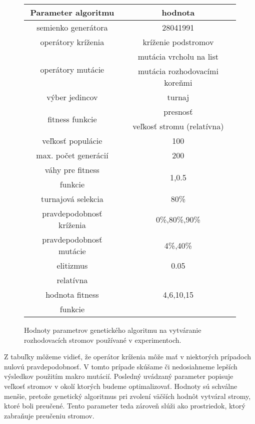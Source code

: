 \begin{figure}[h]
\centering
\begin{tabular}{|c c|}
\hline 
Parameter algoritmu & hodnota \\
\hline
semienko generátora & 28041991 \\
\hline
operátory kríženia & kríženie podstromov \\
\hline
\multirow{2}{*}{operátory mutácie} & mutácia vrcholu na list \\
 & mutácia rozhodovacími koreňmi \\
\hline
výber jedincov & turnaj \\
\hline
\multirow{2}{*}{fitness funkcie} & presnosť\\
 & veľkosť stromu (relatívna) \\
\hline
veľkosť populácie & 100 \\
\hline
max. počet generácií & 200 \\
\hline
váhy pre fitness & \multirow{2}{*}{1,0.5} \\
funkcie & \\
\hline
turnajová selekcia & 80\% \\
\hline
pravdepodobnosť kríženia & 0\%,80\%,90\%\\
\hline
pravdepodobnosť mutácie & 4\%,40\%\\
\hline
elitizmus & 0.05\\
\hline
relatívna & \multirow{3}{*}{4,6,10,15}\\
hodnota fitness & \\
funkcie & \\
\hline
\end{tabular}
\caption{Hodnoty parametrov genetického algoritmu na vytváranie rozhodovacích stromov používané v experimentoch.}\label{fig:configs}
\end{figure}

Z tabuľky môžeme vidieť, že operátor kríženia môže mať v niektorých prípadoch nulovú pravdepodobnosť. V tomto prípade skúšame či nedosiahneme lepších výsledkov použitím makro mutácií.
Posledný uvádzaný parameter popisuje veľkosť stromov v okolí ktorých budeme optimalizovať. Hodnoty sú schválne menšie, pretože genetický algoritmus pri zvolení väčších hodnôt vytváral stromy, ktoré boli preučené. Tento parameter teda zároveň slúži ako prostriedok, ktorý zabraňuje preučeniu stromov. 

